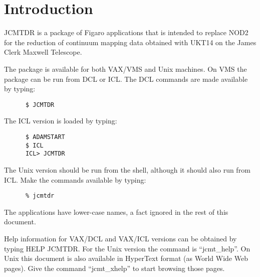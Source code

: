 \stardocabstract
 \newpage
 \begin{latexonly}
   \setlength{\parskip}{0mm}
   \latexonlytoc
   \setlength{\parskip}{\medskipamount}
   \markright{\stardocname}
 \end{latexonly}
\newpage
\renewcommand{\thepage}{\arabic{page}}
\setcounter{page}{1}

\section{Introduction}

JCMTDR is a package of Figaro applications that is intended to replace
NOD2 for the reduction of continuum mapping data obtained with UKT14
on the James Clerk Maxwell Telescope.

The package is available for both VAX/VMS and Unix machines. 
On VMS the package can be run from DCL or ICL.
The DCL commands are made available by typing:

\begin{verbatim}
      $ JCMTDR
\end{verbatim}

The ICL version is loaded by typing:

\begin{verbatim}
      $ ADAMSTART
      $ ICL
      ICL> JCMTDR
\end{verbatim}

The Unix version should be run from the shell, although it should also
run from ICL. Make the commands available by typing:

\begin{verbatim}
      % jcmtdr
\end{verbatim}

The applications have lower-case names, a fact ignored in the rest of
this document.

Help information for VAX/DCL and VAX/ICL versions can be obtained by
typing HELP JCMTDR. For the Unix version the command is ``jcmt\_help''.
On Unix this document is also available in HyperText format (as World
Wide Web pages). Give the command ``jcmt\_xhelp'' to start browsing
those pages.


